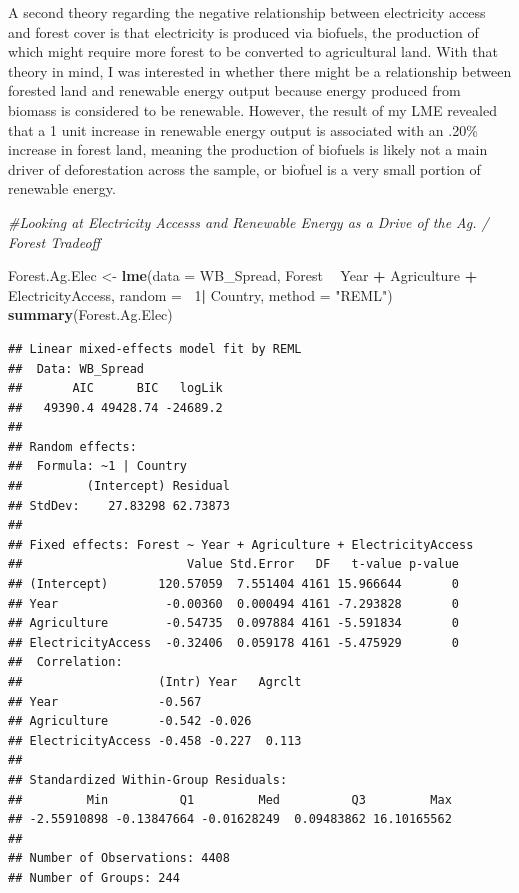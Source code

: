 \documentclass[12pt,]{article}
\newenvironment{Shaded}{\begin{snugshade}}{\end{snugshade}}
\newcommand{\KeywordTok}[1]{\textcolor[rgb]{0.13,0.29,0.53}{\textbf{#1}}}
\newcommand{\DataTypeTok}[1]{\textcolor[rgb]{0.13,0.29,0.53}{#1}}
\newcommand{\DecValTok}[1]{\textcolor[rgb]{0.00,0.00,0.81}{#1}}
\newcommand{\StringTok}[1]{\textcolor[rgb]{0.31,0.60,0.02}{#1}}
\newcommand{\CommentTok}[1]{\textcolor[rgb]{0.56,0.35,0.01}{\textit{#1}}}
\newcommand{\OperatorTok}[1]{\textcolor[rgb]{0.81,0.36,0.00}{\textbf{#1}}}
\newcommand{\NormalTok}[1]{#1}
\begin{document}
A second theory regarding the negative relationship between electricity
access and forest cover is that electricity is produced via biofuels,
the production of which might require more forest to be converted to
agricultural land. With that theory in mind, I was interested in whether
there might be a relationship between forested land and renewable energy
output because energy produced from biomass is considered to be
renewable. However, the result of my LME revealed that a 1 unit increase
in renewable energy output is associated with an .20\% increase in
forest land, meaning the production of biofuels is likely not a main
driver of deforestation across the sample, or biofuel is a very small
portion of renewable energy.

\begin{Shaded}
\begin{Highlighting}[]
\CommentTok{#Looking at Electricity Accesss and Renewable Energy as a Drive of the Ag. / Forest Tradeoff}

\NormalTok{Forest.Ag.Elec <-}\StringTok{ }\KeywordTok{lme}\NormalTok{(}\DataTypeTok{data =}\NormalTok{ WB_Spread, }
\NormalTok{                    Forest }\OperatorTok{~}\StringTok{ }\NormalTok{Year }\OperatorTok{+}\StringTok{ }\NormalTok{Agriculture }\OperatorTok{+}\StringTok{ }\NormalTok{ElectricityAccess,}
                    \DataTypeTok{random =} \OperatorTok{~}\DecValTok{1}\OperatorTok{|}\StringTok{ }\NormalTok{Country,}
                    \DataTypeTok{method =} \StringTok{"REML"}\NormalTok{)}
\KeywordTok{summary}\NormalTok{(Forest.Ag.Elec)}
\end{Highlighting}
\end{Shaded}

\begin{verbatim}
## Linear mixed-effects model fit by REML
##  Data: WB_Spread 
##       AIC      BIC   logLik
##   49390.4 49428.74 -24689.2
## 
## Random effects:
##  Formula: ~1 | Country
##         (Intercept) Residual
## StdDev:    27.83298 62.73873
## 
## Fixed effects: Forest ~ Year + Agriculture + ElectricityAccess 
##                       Value Std.Error   DF   t-value p-value
## (Intercept)       120.57059  7.551404 4161 15.966644       0
## Year               -0.00360  0.000494 4161 -7.293828       0
## Agriculture        -0.54735  0.097884 4161 -5.591834       0
## ElectricityAccess  -0.32406  0.059178 4161 -5.475929       0
##  Correlation: 
##                   (Intr) Year   Agrclt
## Year              -0.567              
## Agriculture       -0.542 -0.026       
## ElectricityAccess -0.458 -0.227  0.113
## 
## Standardized Within-Group Residuals:
##         Min          Q1         Med          Q3         Max 
## -2.55910898 -0.13847664 -0.01628249  0.09483862 16.10165562 
## 
## Number of Observations: 4408
## Number of Groups: 244
\end{verbatim}
\end{document}

